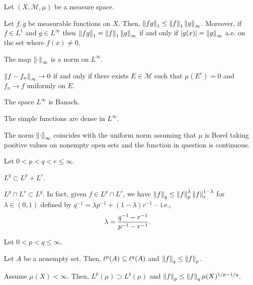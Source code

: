 \documentclass[11pt]{article}
\newcommand{\M}{\mathcal{M}}
\begin{document}
\begin{theorem}
Let $(X,\M,\mu)$ be a measure space.
\begin{enum}{\alph}
\item Let $f,g$ be measurable functions on $X$. Then, $\left\lVert fg\right\rVert_1\leq\left\lVert f\right\rVert_1\left\lVert g\right\rVert_{\infty}$. Moreover, if $f\in L^1$ and $g\in L^{\infty}$ then $\left\lVert fg\right\rVert_1=\left\lVert f\right\rVert_1\left\lVert g\right\rVert_{\infty}$ if and only if $|g(x)|=\left\lVert g\right\rVert_{\infty}$ a.e. on the set where $f(x)\neq0$.

\item The map $\left\lVert\cdot\right\rVert_{\infty}$ is a norm on $L^{\infty}$.

\item $\left\lVert f-f_n\right\rVert_{\infty}\to0$ if and only if there exists $E\in\M$ such that $\mu(E^c)=0$ and $f_n\to f$ uniformly on $E$.

\item The space $L^{\infty}$ is Banach.

\item The simple functions are dense in $L^{\infty}$.
\end{enum}
\end{theorem}

\begin{remark}
The norm $\left\lVert\cdot\right\rVert_{\infty}$ coincides with the uniform norm assuming that $\mu$ is Borel taking positive values on nonempty open sets and the function in question is continuous.
\end{remark}

\begin{proposition}
Let $0<p<q<r\leq\infty$.
\begin{enum}{\alph}
\item $L^q\subset L^p+L^r$.

\item $L^p\cap L^r\subset L^q$. In fact, given $f\in L^p\cap L^r$, we have $\left\lVert f\right\rVert_q\leq\left\lVert f\right\rVert_p^{\lambda}\left\lVert f\right\rVert_r^{1-\lambda}$ for $\lambda\in(0,1)$ defined by $q^{-1}=\lambda p^{-1}+(1-\lambda)r^{-1}$ -- i.e., 
$$\lambda=\dfrac{q^{-1}-r^{-1}}{p^{-1}-r^{-1}}.$$
\end{enum}
\end{proposition}

\begin{proposition}
Let $0<p<q\leq\infty$.
\begin{enum}{\alph}
\item Let $A$ be a nonempty set. Then, $\ell^p(A)\subseteq\ell^q(A)$ and $\left\lVert f\right\rVert_q\leq\left\lVert f\right\rVert_p$.

\item Assume $\mu(X)<\infty$. Then, $L^p(\mu)\supset L^q(\mu)$ and $\left\lVert f\right\rVert_p\leq\left\lVert f\right\rVert_q\mu(X)^{1/p-1/q}$.
\end{enum}
\end{proposition}
\end{document}
